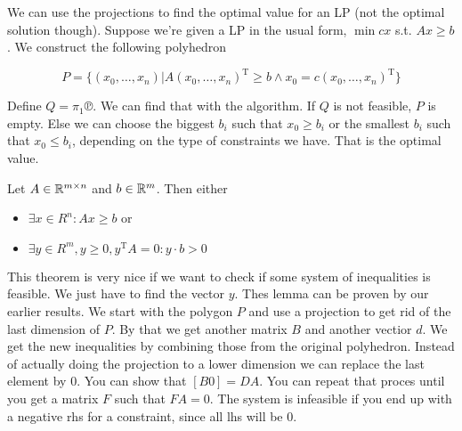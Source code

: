 We can use the projections to find the optimal value for an LP (not the optimal solution though). Suppose we're given a LP in the usual form, $\min cx$ s.t. $Ax\geq b$. We construct the following polyhedron

\[P=\{(x_0,\ldots,x_n) | A(x_0,\ldots,x_n)^{\mbox{T}} \geq b \wedge x_0=c(x_0,\ldots,x_n)^{\mbox{T}}\}\]

Define $Q = \pi_1℗$. We can  find that with the algorithm. If $Q$ is not feasible, $P$ is empty. Else we can choose the biggest $b_i$ such that $x_0\geq b_i$ or the smallest $b_i$ such that $x_0 \leq b_i$, depending on the type of constraints we have. That is the optimal value.

\begin{thm} Let $A\in \mathbb{R}^{m\times n}$ and $b\in \mathbb{R}^m$. Then either 
\begin{itemize}
\item $\exists x\in R^n: Ax\geq b$ or
\item $\exists y\in R^m, y\geq 0, y^{\mbox{T}}A=0: y\cdot b>0$
\end{itemize}
\end{thm}

This theorem is very nice if we want to check if some system of inequalities is feasible. We just have to find the vector $y$. Thes lemma can be proven by our earlier results. We start with the polygon $P$ and use a projection to get rid of the last dimension of $P$. By that we get another matrix $B$ and another vectior $d$. We get the new inequalities by combining those from the original polyhedron. Instead of actually doing the projection to a lower dimension we can replace the last element by 0. You can show that $[B0]=DA$. You can repeat that proces until you get a matrix $F$ such that $FA=0$. The system is infeasible if you end up with a negative rhs for a constraint, since all lhs will be 0.